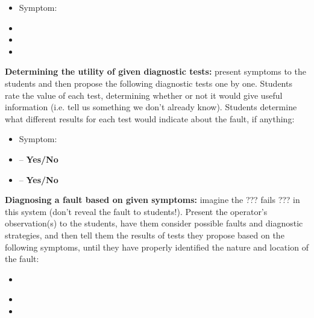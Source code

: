 \begin{itemize}
\item{} Symptom: {\it }
\item{} 
\item{} 
\item{} 
\end{itemize}


\vskip 10pt


\noindent
{\bf Determining the utility of given diagnostic tests:} present symptoms to the students and then propose the following diagnostic tests one by one.  Students rate the value of each test, determining whether or not it would give useful information (i.e. tell us something we don't already know).  Students determine what different results for each test would indicate about the fault, if anything:

\begin{itemize}
\item{} Symptom: {\it }
\item{}  -- {\bf Yes/No}
\item{}  -- {\bf Yes/No}
\end{itemize}


\vskip 10pt


\noindent
{\bf Diagnosing a fault based on given symptoms:} imagine the ??? fails ??? in this system (don't reveal the fault to students!).  Present the operator's observation(s) to the students, have them consider possible faults and diagnostic strategies, and then tell them the results of tests they propose based on the following symptoms, until they have properly identified the nature and location of the fault:

\begin{itemize}
\item{} {\it }
\item{} 
\item{} 
\end{itemize}







